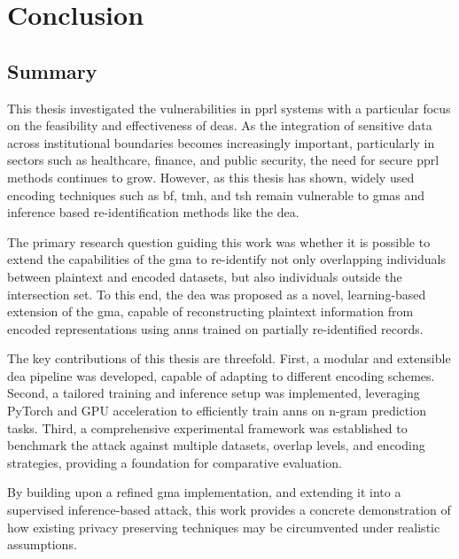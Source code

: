 \chapter{Conclusion}  \label{sec:conclusion}

\section{Summary}   \label{sec:summary}

This thesis investigated the vulnerabilities in \ac{pprl} systems with a particular focus on the feasibility and effectiveness of \ac{dea}s.
As the integration of sensitive data across institutional boundaries becomes increasingly important, particularly in sectors such as healthcare, finance, and public security, the need for secure \ac{pprl} methods continues to grow.
However, as this thesis has shown, widely used encoding techniques such as \ac{bf}, \ac{tmh}, and \ac{tsh} remain vulnerable to \ac{gma}s and inference based re-identification methods like the \ac{dea}.

The primary research question guiding this work was whether it is possible to extend the capabilities of the \ac{gma} to re-identify not only overlapping individuals between plaintext and encoded datasets, but also individuals outside the intersection set.
To this end, the \ac{dea} was proposed as a novel, learning-based extension of the \ac{gma}, capable of reconstructing plaintext information from encoded representations using \ac{ann}s trained on partially re-identified records.

The key contributions of this thesis are threefold.
First, a modular and extensible \ac{dea} pipeline was developed, capable of adapting to different encoding schemes.
Second, a tailored training and inference setup was implemented, leveraging PyTorch and GPU acceleration to efficiently train \ac{ann}s on n-gram prediction tasks.
Third, a comprehensive experimental framework was established to benchmark the attack against multiple datasets, overlap levels, and encoding strategies, providing a foundation for comparative evaluation.

By building upon a refined \ac{gma} implementation, and extending it into a supervised inference-based attack, this work provides a concrete demonstration of how existing privacy preserving techniques may be circumvented under realistic assumptions.

